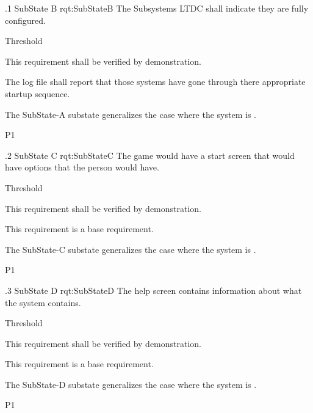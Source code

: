 \ONERQMTV
{\RqtNumberBase.1}
{SubState B}
{rqt:SubStateB}
{The Subsystems LTDC shall indicate they are fully configured.}
{
	\item [Phase 1] Threshold
}
{This requirement shall be verified by demonstration.}
{
	\item [1] The log file shall report that those systems have gone through there appropriate startup sequence.
}
{
	\item The SubState-A substate generalizes the case where the system is \TBD.
}
{P1}

\ONERQMTV
{\RqtNumberBase.2}
{SubState C}
{rqt:SubStateC}
{The game would have a start screen that would have options that the person would have.}
{
	\item [Phase 1] Threshold
}
{This requirement shall be verified by demonstration.}
{
	\item [N/A] This requirement is a base requirement.
}
{
	\item The SubState-C substate generalizes the case where the system is \TBD.
}
{P1}


\ONERQMTV
{\RqtNumberBase.3}
{SubState D}
{rqt:SubStateD}
{The help screen contains information about what the system contains.}
{
	\item [Phase 1] Threshold
}
{This requirement shall be verified by demonstration.}
{
	\item [N/A] This requirement is a base requirement.
}
{
	\item The SubState-D substate generalizes the case where the system is \TBD.
}
{P1}

